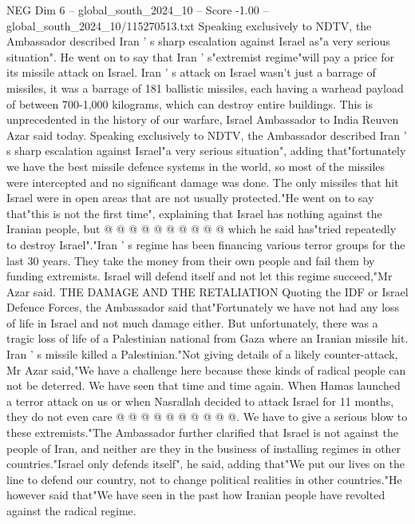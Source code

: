 \begin{textsample}{NEG Dim 6 – global\_south\_2024\_10 – Score -1.00 – global\_south\_2024\_10/115270513.txt}  \label{ex:f6_neg_058}
Speaking exclusively to NDTV, the Ambassador described Iran ' s sharp escalation against Israel as"a very serious situation".
He went on to say that Iran ' s"extremist regime"will pay a price for its missile attack on Israel.
Iran ' s attack on Israel wasn't just a barrage of missiles, it was a barrage of 181 ballistic missiles, each having a warhead payload of between 700-1,000 kilograms, which can destroy entire buildings.
This is unprecedented in the history of our warfare, Israel Ambassador to India Reuven Azar said today.
Speaking exclusively to NDTV, the Ambassador described Iran ' s sharp escalation against Israel"a very serious situation", adding that"fortunately we have the best missile defence systems in the world, so most of the missiles were intercepted and no significant damage was done.
The only missiles that hit Israel were in open areas that are not usually protected."He went on to say that"this is not the first time", explaining that Israel has nothing against the Iranian people, but @ @ @ @ @ @ @ @ @ @ which he said has"tried repeatedly to destroy Israel"."Iran ' s regime has been financing various terror groups for the last 30 years.
They take the money from their own people and fail them by funding extremists.
Israel will defend itself and not let this regime succeed,"Mr Azar said.
THE DAMAGE AND THE RETALIATION Quoting the IDF or Israel Defence Forces, the Ambassador said that"Fortunately we have not had any loss of life in Israel and not much damage either.
But unfortunately, there was a tragic loss of life of a Palestinian national from Gaza where an Iranian missile hit.
Iran ' s missile killed a Palestinian."Not giving details of a likely counter-attack, Mr Azar said,"We have a challenge here because these kinds of radical people can not be deterred.
We have seen that time and time again.
When Hamas launched a terror attack on us or when Nasrallah decided to attack Israel for 11 months, they do not even care @ @ @ @ @ @ @ @ @ @.
We have to give a serious blow to these extremists."The Ambassador further clarified that Israel is not against the people of Iran, and neither are they in the business of installing regimes in other countries."Israel only defends itself", he said, adding that"We put our lives on the line to defend our country, not to change political realities in other countries."He however said that"We have seen in the past how Iranian people have revolted against the radical regime.

\end{textsample}
